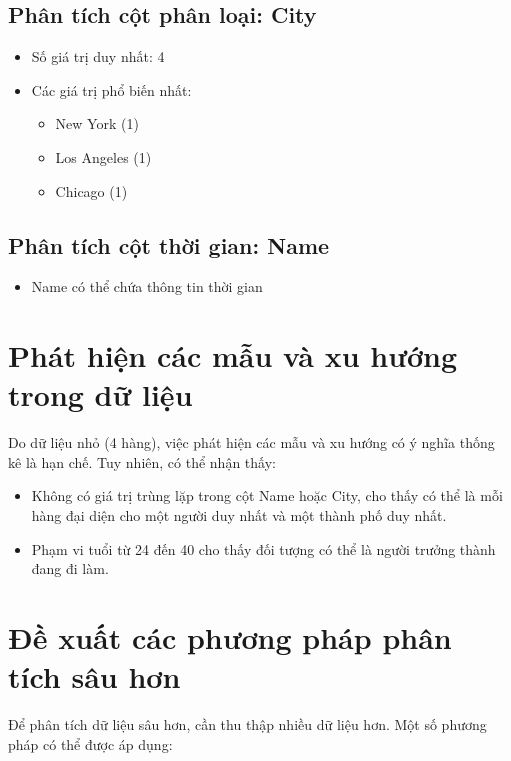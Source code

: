 \documentclass[12pt]{article}
\begin{document}
\subsection{Phân tích cột phân loại: City}

\begin{itemize}
    \item Số giá trị duy nhất: 4
    \item Các giá trị phổ biến nhất:
    \begin{itemize}
        \item New York (1)
        \item Los Angeles (1)
        \item Chicago (1)
    \end{itemize}
\end{itemize}

\subsection{Phân tích cột thời gian: Name}

\begin{itemize}
    \item Name có thể chứa thông tin thời gian
\end{itemize}

\section{Phát hiện các mẫu và xu hướng trong dữ liệu}

Do dữ liệu nhỏ (4 hàng), việc phát hiện các mẫu và xu hướng có ý nghĩa thống kê là hạn chế. Tuy nhiên, có thể nhận thấy:

\begin{itemize}
    \item Không có giá trị trùng lặp trong cột Name hoặc City, cho thấy có thể là mỗi hàng đại diện cho một người duy nhất và một thành phố duy nhất.
    \item Phạm vi tuổi từ 24 đến 40 cho thấy đối tượng có thể là người trưởng thành đang đi làm.
\end{itemize}

\section{Đề xuất các phương pháp phân tích sâu hơn}

Để phân tích dữ liệu sâu hơn, cần thu thập nhiều dữ liệu hơn. Một số phương pháp có thể được áp dụng:
\end{document}
